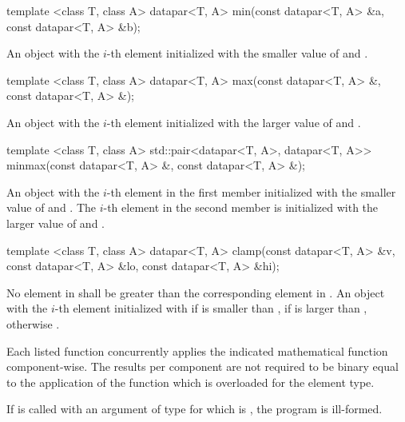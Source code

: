 \begin{itemdecl}
template <class T, class A>
datapar<T, A> min(const datapar<T, A> &a, const datapar<T, A> &b);
\end{itemdecl}
\begin{itemdescr}
  \pnum\returns An object with the $i$-th element initialized with the smaller value of  and  \foralli.
\end{itemdescr}

\begin{itemdecl}
template <class T, class A>
datapar<T, A> max(const datapar<T, A> &, const datapar<T, A> &);
\end{itemdecl}
\begin{itemdescr}
  \pnum\returns An object with the $i$-th element initialized with the larger value of  and  \foralli.
\end{itemdescr}

\begin{itemdecl}
template <class T, class A>
std::pair<datapar<T, A>, datapar<T, A>> minmax(const datapar<T, A> &,
                                               const datapar<T, A> &);
\end{itemdecl}
\begin{itemdescr}
  \pnum\returns An object with the $i$-th element in the first  member initialized with the smaller value of  and  \foralli.
  The $i$-th element in the second  member is initialized with the larger value of  and  \foralli.
\end{itemdescr}

\begin{itemdecl}
template <class T, class A>
datapar<T, A> clamp(const datapar<T, A> &v, const datapar<T, A> &lo,
                    const datapar<T, A> &hi);
\end{itemdecl}
\begin{itemdescr}
  \pnum\requires No element in  shall be greater than the corresponding element in .
  \pnum\returns An object with the $i$-th element initialized with  if  is smaller than ,  if  is larger than , otherwise  \foralli.
\end{itemdescr}



\pnum Each listed function concurrently applies the indicated mathematical function component-wise.
The results per component are not required to be binary equal to the application of the function which is overloaded for the element type.

\pnum If  is called with an argument of type \datapar[<X, Abi>] for which  is \true, the program is ill-formed.

